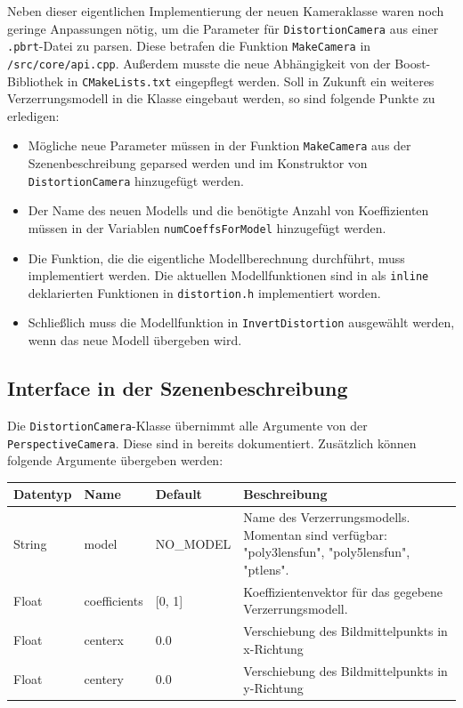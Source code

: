 Neben dieser eigentlichen Implementierung der neuen Kameraklasse waren noch geringe Anpassungen nötig, um die Parameter für \texttt{DistortionCamera} aus einer \texttt{.pbrt}-Datei zu parsen. Diese betrafen die Funktion \texttt{MakeCamera} in \texttt{/src/core/api.cpp}. Außerdem musste die neue Abhängigkeit von der Boost-Bibliothek in \texttt{CMakeLists.txt} eingepflegt werden. Soll in Zukunft ein weiteres Verzerrungsmodell in die Klasse eingebaut werden, so sind folgende Punkte zu erledigen:
\begin{itemize}
	\item Mögliche neue Parameter müssen in der Funktion \texttt{MakeCamera} aus der Szenenbeschreibung geparsed werden und im Konstruktor von \texttt{DistortionCamera} hinzugefügt werden.
	\item Der Name des neuen Modells und die benötigte Anzahl von Koeffizienten müssen in der Variablen \texttt{numCoeffsForModel} hinzugefügt werden.
	\item Die Funktion, die die eigentliche Modellberechnung durchführt, muss implementiert werden. Die aktuellen Modellfunktionen sind in als \texttt{inline} deklarierten Funktionen in \texttt{distortion.h} implementiert worden.
	\item Schließlich muss die Modellfunktion in \texttt{InvertDistortion} ausgewählt werden, wenn das neue Modell übergeben wird.
\end{itemize}

\subsection{Interface in der Szenenbeschreibung}

Die \texttt{DistortionCamera}-Klasse übernimmt alle Argumente von der \texttt{PerspectiveCamera}. Diese sind in \cite{pbrt_file} bereits dokumentiert. Zusätzlich können folgende Argumente übergeben werden:
\begin{table}[h]
	\begin{tabularx}{\textwidth}{l|l|l|X}
		\textbf{Datentyp} & \textbf{Name} & \textbf{Default} & \textbf{Beschreibung} \\ \hline \hline
		String & model & NO\_MODEL & Name des Verzerrungsmodells. Momentan sind verfügbar: "poly3lensfun", \mbox{"poly5lensfun"}, "ptlens".\\
		Float & coefficients & [0, 1] & Koeffizientenvektor für das gegebene Verzerrungsmodell. \\
		Float & centerx & 0.0 & Verschiebung des Bildmittelpunkts in \mbox{x-Richtung} \\
		Float & centery & 0.0 & Verschiebung des Bildmittelpunkts in \mbox{y-Richtung}
	\end{tabularx}
\end{table}
